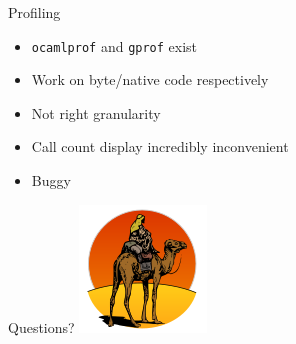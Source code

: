 \documentclass{beamer}
\begin{document}
\begin{frame}{Profiling}
  \begin{itemize}
    \item \texttt{ocamlprof} and \texttt{gprof} exist
    \item Work on byte/native code respectively
    \item Not right granularity
    \item Call count display incredibly inconvenient
    \item Buggy
  \end{itemize}
\end{frame}

\begin{frame}{Questions?}
  \centering
  \includegraphics[height=.85\textheight]{camel}
\end{frame}
\end{document}
